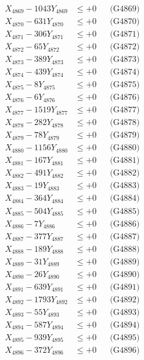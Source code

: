 \documentclass[a4paper,10pt]{article}
\begin{document}
{\begin{align}
X_{4869} - 1043Y_{4869} &\leq +0 && \text{(G4869)} \\
X_{4870} - 631Y_{4870} &\leq +0 && \text{(G4870)} \\
\allowbreak
X_{4871} - 306Y_{4871} &\leq +0 && \text{(G4871)} \\
X_{4872} - 65Y_{4872} &\leq +0 && \text{(G4872)} \\
X_{4873} - 389Y_{4873} &\leq +0 && \text{(G4873)} \\
X_{4874} - 439Y_{4874} &\leq +0 && \text{(G4874)} \\
X_{4875} - 8Y_{4875} &\leq +0 && \text{(G4875)} \\
X_{4876} - 6Y_{4876} &\leq +0 && \text{(G4876)} \\
X_{4877} - 1519Y_{4877} &\leq +0 && \text{(G4877)} \\
X_{4878} - 282Y_{4878} &\leq +0 && \text{(G4878)} \\
X_{4879} - 78Y_{4879} &\leq +0 && \text{(G4879)} \\
X_{4880} - 1156Y_{4880} &\leq +0 && \text{(G4880)} \\
\allowbreak
X_{4881} - 167Y_{4881} &\leq +0 && \text{(G4881)} \\
X_{4882} - 491Y_{4882} &\leq +0 && \text{(G4882)} \\
X_{4883} - 19Y_{4883} &\leq +0 && \text{(G4883)} \\
X_{4884} - 364Y_{4884} &\leq +0 && \text{(G4884)} \\
X_{4885} - 504Y_{4885} &\leq +0 && \text{(G4885)} \\
X_{4886} - 7Y_{4886} &\leq +0 && \text{(G4886)} \\
X_{4887} - 377Y_{4887} &\leq +0 && \text{(G4887)} \\
X_{4888} - 189Y_{4888} &\leq +0 && \text{(G4888)} \\
X_{4889} - 31Y_{4889} &\leq +0 && \text{(G4889)} \\
X_{4890} - 26Y_{4890} &\leq +0 && \text{(G4890)} \\
\allowbreak
X_{4891} - 639Y_{4891} &\leq +0 && \text{(G4891)} \\
X_{4892} - 1793Y_{4892} &\leq +0 && \text{(G4892)} \\
X_{4893} - 55Y_{4893} &\leq +0 && \text{(G4893)} \\
X_{4894} - 587Y_{4894} &\leq +0 && \text{(G4894)} \\
X_{4895} - 939Y_{4895} &\leq +0 && \text{(G4895)} \\
X_{4896} - 372Y_{4896} &\leq +0 && \text{(G4896)} \\

\end{align}}
\end{document}
